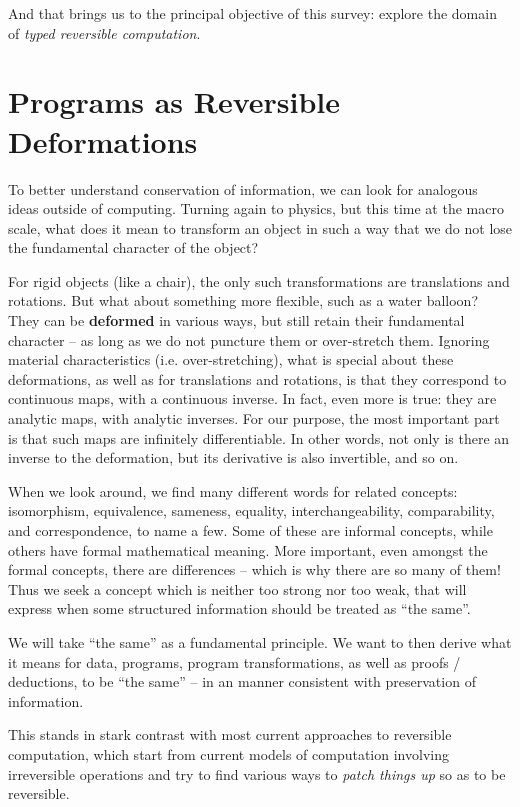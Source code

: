 \documentclass{article}
\begin{document}
And that brings us to the principal objective of this survey: explore the
domain of \emph{typed reversible computation}.

\section{Programs as Reversible Deformations} 

To better understand conservation of information, we can look
for analogous ideas outside of computing. Turning again to physics,
but this time at the macro scale, what does it mean to transform an
object in such a way that we do not lose the fundamental character
of the object?

For rigid objects (like a chair), the only such transformations are
translations and rotations. But what about something more flexible,
such as a water balloon?  They can be \textbf{deformed} in various ways,
but still retain their fundamental character -- as long as we do not
puncture them or over-stretch them. Ignoring material characteristics
(i.e. over-stretching), what is special about these deformations, as well
as for translations and rotations, is that they correspond to
continuous maps, with a continuous inverse. In fact, even more is
true: they are analytic maps, with analytic inverses. For our purpose,
the most important part is that such maps are infinitely differentiable.
In other words, not only is there an inverse to the deformation, but
its derivative is also invertible, and so on.

When we look around, we find many different words for related
concepts: isomorphism, equivalence, sameness, equality, interchangeability,
comparability, and correspondence, to name a few. Some of these
are informal concepts, while others have formal mathematical meaning.
More important, even amongst the formal concepts, there are differences
-- which is why there are so many of them! Thus we seek a concept
which is neither too strong nor too weak, that will express when
some structured information should be treated as ``the same''.

We will take ``the same'' as a fundamental principle. We want
to then derive what it means for data, programs, program
transformations, as well as proofs / deductions, to be ``the
same'' -- in an manner consistent with preservation of 
information.

This stands in stark contrast with most current approaches to
reversible computation, which start from current models of
computation involving irreversible operations and try to find
various ways to \emph{patch things up} so as to be reversible.
\end{document}
